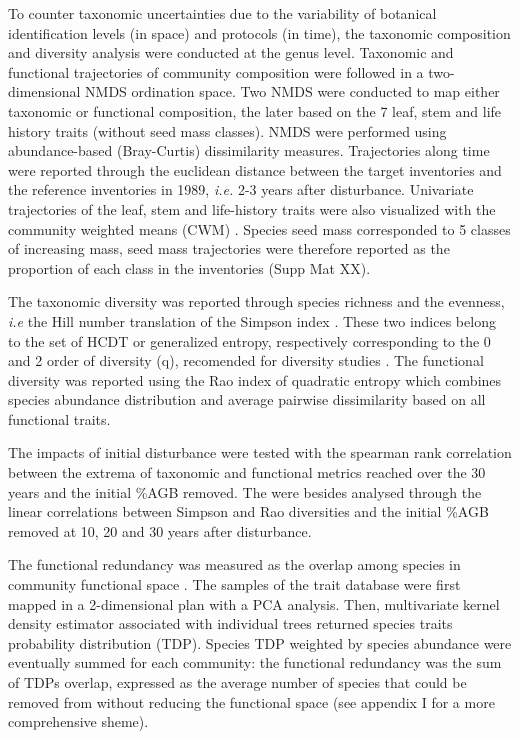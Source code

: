 \documentclass[fleqn,10pt]{ArtEcoFoG} %
\begin{document}
To counter taxonomic uncertainties due to the variability of botanical
identification levels (in space) and protocols (in time), the taxonomic
composition and diversity analysis were conducted at the genus level.
Taxonomic and functional trajectories of community composition were
followed in a two-dimensional NMDS ordination space. Two NMDS were
conducted to map either taxonomic or functional composition, the later
based on the 7 leaf, stem and life history traits (without seed mass
classes). NMDS were performed using abundance-based (Bray-Curtis)
dissimilarity measures. Trajectories along time were reported through
the euclidean distance between the target inventories and the reference
inventories in 1989, \emph{i.e.} 2-3 years after disturbance. Univariate
trajectories of the leaf, stem and life-history traits were also
visualized with the community weighted means (CWM)
\citep{Diaz2007, Garnier2004}. Species seed mass corresponded to 5
classes of increasing mass, seed mass trajectories were therefore
reported as the proportion of each class in the inventories (Supp Mat
XX).

The taxonomic diversity was reported through species richness and the
evenness, \emph{i.e} the Hill number translation of the Simpson index
\citep{Hill1973}. These two indices belong to the set of HCDT or
generalized entropy, respectively corresponding to the 0 and 2 order of
diversity (q), recomended for diversity studies
\citep{Patil1982, Tothmeresz1995, Marcon2015}. The functional diversity
was reported using the Rao index of quadratic entropy which combines
species abundance distribution and average pairwise dissimilarity based
on all functional traits.

The impacts of initial disturbance were tested with the spearman rank
correlation between the extrema of taxonomic and functional metrics
reached over the 30 years and the initial \%AGB removed. The were
besides analysed through the linear correlations between Simpson and Rao
diversities and the initial \%AGB removed at 10, 20 and 30 years after
disturbance.

The functional redundancy was measured as the overlap among species in
community functional space \citep{Carmona2016}. The samples of the trait
database were first mapped in a 2-dimensional plan with a PCA analysis.
Then, multivariate kernel density estimator associated with individual
trees returned species traits probability distribution (TDP). Species
TDP weighted by species abundance were eventually summed for each
community: the functional redundancy was the sum of TDPs overlap,
expressed as the average number of species that could be removed from
without reducing the functional space (see appendix I for a more
comprehensive sheme).
\end{document}
